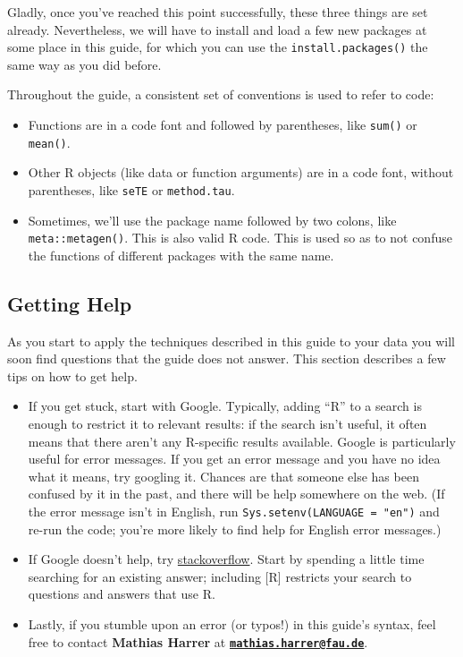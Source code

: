 \documentclass[]{book}
\providecommand{\tightlist}{%
  \setlength{\itemsep}{0pt}\setlength{\parskip}{0pt}}
\theoremstyle{definition}
\theoremstyle{definition}
\theoremstyle{definition}
\theoremstyle{remark}
\begin{document}
Gladly, once you've reached this point successfully, these three things
are set already. Nevertheless, we will have to install and load a few
new packages at some place in this guide, for which you can use the
\texttt{install.packages()} the same way as you did before.

Throughout the guide, a consistent set of conventions is used to refer
to code:

\begin{itemize}
\tightlist
\item
  Functions are in a code font and followed by parentheses, like
  \texttt{sum()} or \texttt{mean()}.
\item
  Other R objects (like data or function arguments) are in a code font,
  without parentheses, like \texttt{seTE} or \texttt{method.tau}.
\item
  Sometimes, we'll use the package name followed by two colons, like
  \texttt{meta::metagen()}. This is also valid R code. This is used so
  as to not confuse the functions of different packages with the same
  name.
\end{itemize}

\subsection{Getting Help}\label{getting-help}

As you start to apply the techniques described in this guide to your
data you will soon find questions that the guide does not answer. This
section describes a few tips on how to get help.

\begin{itemize}
\tightlist
\item
  If you get stuck, start with Google. Typically, adding ``R'' to a
  search is enough to restrict it to relevant results: if the search
  isn't useful, it often means that there aren't any R-specific results
  available. Google is particularly useful for error messages. If you
  get an error message and you have no idea what it means, try googling
  it. Chances are that someone else has been confused by it in the past,
  and there will be help somewhere on the web. (If the error message
  isn't in English, run \texttt{Sys.setenv(LANGUAGE\ =\ "en")} and
  re-run the code; you're more likely to find help for English error
  messages.)
\item
  If Google doesn't help, try \href{stackoverflow.com}{stackoverflow}.
  Start by spending a little time searching for an existing answer;
  including {[}R{]} restricts your search to questions and answers that
  use R.
\item
  Lastly, if you stumble upon an error (or typos!) in this guide's
  syntax, feel free to contact \textbf{Mathias Harrer} at
  \textbf{\href{mailto:mathias.harrer@fau.de}{\nolinkurl{mathias.harrer@fau.de}}}.
\end{itemize}
\end{document}
